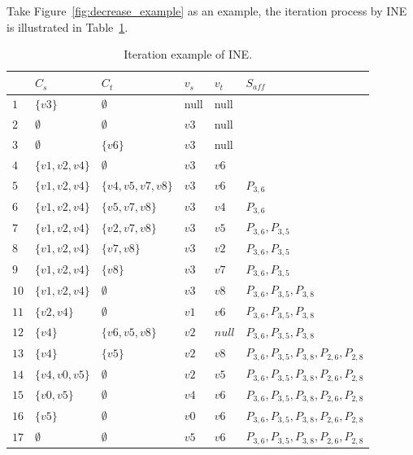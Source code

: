 Take Figure~\ref{fig:decrease_example} as an example, the iteration process by INE is illustrated in Table~\ref{tab:algo3}.
\begin{table}[htbp]
	\centering
	\caption{Iteration example of INE.}
	\begin{tabular}{|l|l|l|l|l|l|}
    \hline
     & $C_s$ & $C_t$ & $v_s$ & $v_t$ & $S_\textit{aff}$ \\
    \hline
    $1$ & $\{v3\}$ 		  & $\emptyset$ 	  & null & null &  \\
    $2$ & $\emptyset$	  & $\emptyset$       & $v3$ & null &  \\
    $3$ & $\emptyset$  & $\{v6\}$          & $v3$ & null &  \\
	$4$ & $\{v1,v2,v4\}$  & $\emptyset$ 	  & $v3$ & $v6$ &  \\
    $5$ & $\{v1,v2,v4\}$  & $\{v4,v5,v7,v8\}$ & $v3$ & $v6$ & $P_{3,6}$ \\
    $6$ & $\{v1,v2,v4\}$  & $\{v5,v7,v8\}$    & $v3$ & $v4$ & $P_{3,6}$ \\
    $7$ & $\{v1,v2,v4\}$  & $\{v2,v7,v8\}$ 	  & $v3$ & $v5$ & $P_{3,6},P_{3,5}$ \\
    $8$ & $\{v1,v2,v4\}$  & $\{v7,v8\}$ 	  & $v3$ & $v2$ & $P_{3,6},P_{3,5}$ \\
    $9$ & $\{v1,v2,v4\}$ & $\{v8\}$ 		  & $v3$ & $v7$ & $P_{3,6},P_{3,5}$ \\
    $10$ & $\{v1,v2,v4\}$ & $\emptyset$ 	  & $v3$ & $v8$ & $P_{3,6},P_{3,5},P_{3,8}$ \\
    $11$ & $\{v2,v4\}$ 	  & $\emptyset$ 	  & $v1$ & $v6$ & $P_{3,6},P_{3,5},P_{3,8}$ \\
    $12$ & $\{v4\}$		  & $\{v6,v5,v8\}$ 	      & $v2$ & $null$ & $P_{3,6},P_{3,5},P_{3,8}$ \\
    $13$ & $\{v4\}$		  & $\{v5\}$ 	  & $v2$ & $v8$ & $P_{3,6},P_{3,5},P_{3,8},P_{2,6},P_{2,8}$ \\
    $14$ & $\{v4,v0,v5\}$		  & $\emptyset$ 	  & $v2$ & $v5$ & $P_{3,6},P_{3,5},P_{3,8},P_{2,6},P_{2,8}$ \\
    $15$ & $\{v0,v5\}$ 	  & $\emptyset$ 	  & $v4$ & $v6$ & $P_{3,6},P_{3,5},P_{3,8},P_{2,6},P_{2,8}$  \\
     $16$ & $\{v5\}$ 	  & $\emptyset$ 	  & $v0$ & $v6$ & $P_{3,6},P_{3,5},P_{3,8},P_{2,6},P_{2,8}$  \\
    $17$ & $\emptyset$ 	  & $\emptyset$ 	  & $v5$ & $v6$ & $P_{3,6},P_{3,5},P_{3,8},P_{2,6},P_{2,8}$  \\
    \hline
    \end{tabular}
    \label{tab:algo3}
\end{table}

